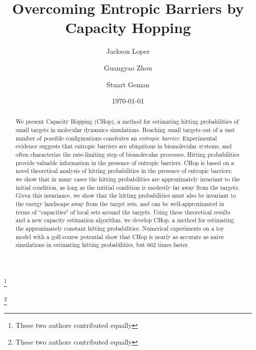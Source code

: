 \documentclass[english, aip, jcp, priprint, graphicx,floatfix]{revtex4-1}
\theoremstyle{plain}
\theoremstyle{definition}
\theoremstyle{plain}
\begin{document}
\title{Overcoming Entropic Barriers by Capacity Hopping} %

\author{Jackson Loper}
\thanks{These two authors contributed equally}

\author{Guangyao Zhou}
\thanks{These two authors contributed equally}

\author{Stuart Geman}

\date{\today}

\begin{abstract}
	We present Capacity Hopping (CHop), a method for estimating hitting probabilities of small targets in molecular dynamics simulations. Reaching small targets out of a vast number of possible configurations consitutes an \emph{entropic barrier}. Experimental evidence suggests that entropic barriers are ubiquitous in biomolecular systems, and often characterize the rate-limiting step of biomolecular processes. Hitting probabilities provide valuable information in the presence of entropic barriers. CHop is based on a novel theoretical analysis of hitting probabilities in the presence of entropic barriers; we show that in many cases the hitting probabilities are approximately invariant to the initial condition, as long as the intitial condition is modestly far away from the targets.  Given this invariance, we show that the hitting probabilities must also be invariant to the energy landscape away from the target sets, and can be well-approximated in terms of ``capacities" of local sets around the targets.  Using these theoretical results and a new capacity estimation algorithm, we develop CHop, a method for estimating the approximately constant hitting probabilities. Numerical experiments on a toy model with a golf-course potential show that CHop is nearly as accurate as naive simulations in estimating hitting probabilities, but 662 times faster.
\end{abstract}

\pacs{}%

\maketitle %
\end{document}
